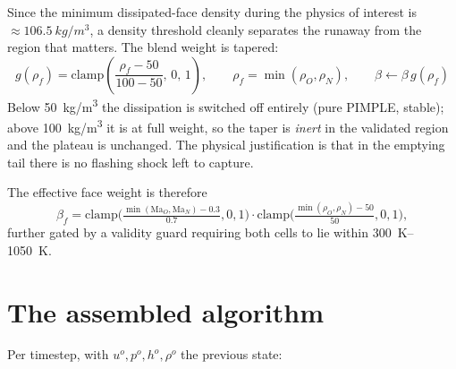 \documentclass[11pt,a4paper]{article}
\begin{document}
Since the minimum dissipated-face density during the physics of interest is
$\approx \SI{106.5}{kg/m^3}$, a density threshold cleanly separates the runaway
from the region that matters. The blend weight is tapered:
\begin{equation}
  \boxed{\;
  g(\rho_f) = \mathrm{clamp}\!\left(\frac{\rho_f - 50}{100 - 50},\,0,\,1\right),
  \qquad \rho_f = \min(\rho_O,\rho_N),
  \qquad \beta \leftarrow \beta\, g(\rho_f) \;}
\end{equation}
Below \SI{50}{kg/m^3} the dissipation is switched off entirely (pure PIMPLE,
stable); above \SI{100}{kg/m^3} it is at full weight, so the taper is
\emph{inert} in the validated region and the plateau is unchanged. The physical
justification is that in the emptying tail there is no flashing shock left to
capture.

The effective face weight is therefore
\begin{equation}
  \beta_f = \mathrm{clamp}\!\Big(\tfrac{\min(\mathrm{Ma}_O,\mathrm{Ma}_N)-0.3}{0.7},0,1\Big)
  \cdot
  \mathrm{clamp}\!\Big(\tfrac{\min(\rho_O,\rho_N)-50}{50},0,1\Big),
\end{equation}
further gated by a validity guard requiring both cells to lie within
\SIrange{300}{1050}{\kelvin}.

\section{The assembled algorithm}\label{sec:algorithm}

Per timestep, with $u^o,p^o,h^o,\rho^o$ the previous state:
\end{document}
